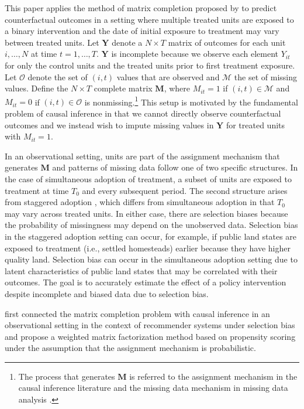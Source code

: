 \documentclass[12pt]{article}
\begin{document}
This paper applies the method of matrix completion proposed by \citet{athey2017matrix} to predict counterfactual outcomes in a setting where multiple treated units are exposed to a binary intervention and the date of initial exposure to treatment may vary between treated units. Let $\mathbf{Y}$ denote a $N \times T$ matrix of outcomes for each unit $i, \ldots, N$ at time $t = 1, \ldots, T$. $\mathbf{Y}$ is incomplete because we observe each element $Y_{it}$ for only the control units and the treated units prior to first treatment exposure. Let $\mathcal{O}$ denote the set of $(i,t)$ values that are observed and $\mathcal{M}$ the set of missing values. Define the $N \times T$ complete matrix $\mathbf{M}$, where $M_{it} =1 $ if $(i,t) \in \mathcal{M}$ and $M_{it} = 0$ if $(i,t) \in \mathcal{O}$ is nonmissing.\footnote{The process that generates $\mathbf{M}$ is referred to the assignment mechanism in the causal inference literature \citep{imbens2015causal} and the missing data mechanism in missing data analysis \citep[Chap.~1]{little2014}.} This setup is motivated by the fundamental problem of causal inference \citep{holland1986statistics} in that we cannot directly observe counterfactual outcomes and we instead wish to impute missing values in $\mathbf{Y}$ for treated units with $M_{it}=1$. 

In an observational setting, units are part of the assignment mechanism that generates $\mathbf{M}$ and patterns of missing data follow one of two specific structures. In the case of simultaneous adoption of treatment, a subset of units are exposed to treatment at time $T_0$ and every subsequent period. The second structure arises from staggered adoption \citep{athey2018design}, which differs from simultaneous adoption in that $T_0$ may vary across treated units. In either case, there are selection biases because the probability of missingness may depend on the unobserved data. Selection bias in the staggered adoption setting can occur, for example, if public land states are exposed to treatment (i.e., settled homesteads) earlier because they have higher quality land. Selection bias can occur in the simultaneous adoption setting due to latent characteristics of public land states that may be correlated with their outcomes. The goal is to accurately estimate the effect of a policy intervention despite incomplete and biased data due to selection bias. 

\citet{schnabel2016recommendations} first connected the matrix completion problem with causal inference in an observational setting in the context of recommender systems under selection bias and propose a weighted matrix factorization method based on propensity scoring under the assumption that the assignment mechanism is probabilistic.
\end{document}
